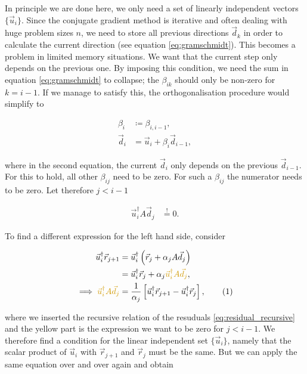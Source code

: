 \documentclass{article}
\newcommand\numberthis{\addtocounter{equation}{1}\tag{\theequation}}
\theoremstyle{plain} %
\theoremstyle{remark} %
\numberwithin{equation}{section}
\begin{document}
In principle we are done here, we only need a set of linearly independent vectors $\{\vec{u}_i\}$. Since the conjugate gradient method is iterative and often dealing with huge problem sizes $n$, we need to store all previous directions $\vec{d}_k$ in order to calculate the current direction (see equation \eqref{eq:gramschmidt}). This becomes a problem in limited memory situations. We want that the current step only depends on the previous one. By imposing this condition, we need the sum in equation \eqref{eq:gramschmidt} to collapse; the $\beta_{ik}$ should only be non-zero for $k=i-1$. If we manage to satisfy this, the orthogonalisation procedure would simplify to

\begin{align*}
    \beta_i &\coloneqq \beta_{i, i-1}, \\
    \vec{d}_i &= \vec{u}_i + \beta_i \vec{d}_{i-1},
\end{align*}

where in the second equation, the current $\vec{d}_i$ only depends on the previous $\vec{d}_{i-1}$. For this to hold, all other $\beta_{ij}$ need to be zero. For such a $\beta_{ij}$ the numerator needs to be zero. Let therefore $j<i-1$

\begin{align*}
    \vec{u}_i^{\dagger} A \vec{d}_j &\stackrel{!}{=} 0.
\end{align*}

To find a different expression for the left hand side, consider

\begin{align*}
    \vec{u}_i^{\dagger} \vec{r}_{j+1} &= \vec{u}_i^{\dagger} \left( \vec{r}_j + \alpha_j A \vec{d}_j \right) \\
    &= \vec{u}_i^{\dagger} \vec{r}_j + \alpha_j \textcolor{cyellow}{\vec{u}_i^{\dagger} A \vec{d}_j}, \\
    \implies \textcolor{cyellow}{\vec{u}_i^{\dagger} A \vec{d}_j} &= \frac{1}{\alpha_j} \left[ \vec{u}_i^{\dagger} \vec{r}_{j+1} - \vec{u}_i^{\dagger} \vec{r}_j \right], \numberthis \label{eq:uiAdj}
\end{align*}

where we inserted the recursive relation of the resuduals \eqref{eq:residual_recursive} and the \textcolor{cyellow}{yellow} part is the expression we want to be \textcolor{cyellow}{zero} for $j<i-1$. We therefore find a condition for the linear independent set $\{\vec{u}_i\}$, namely that the scalar product of $\vec{u}_i$ with $\vec{r}_{j+1}$ and $\vec{r}_{j}$ must be the same. But we can apply the same equation over and over again and obtain
\end{document}
